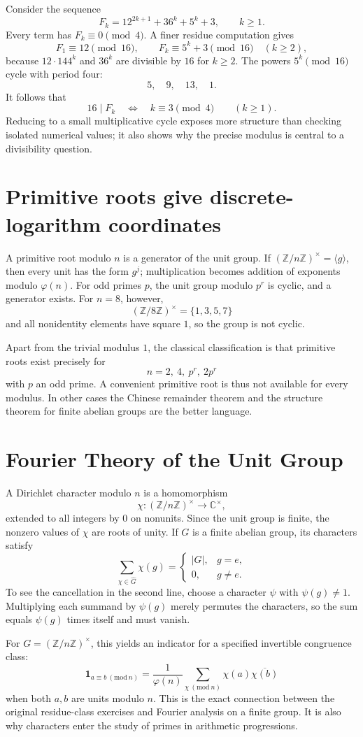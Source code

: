 Consider the sequence
\[
 F_k=12^{2k+1}+36^k+5^k+3,\qquad k\ge1.
\]
Every term has \(F_k\equiv0\pmod4\). A finer residue computation gives
\[
 F_1\equiv12\pmod{16},\qquad
 F_k\equiv5^k+3\pmod{16}\quad(k\ge2),
\]
because \(12\cdot144^k\) and \(36^k\) are divisible by \(16\) for \(k\ge2\). The powers \(5^k\pmod{16}\) cycle with period four:
\[
 5,\quad9,\quad13,\quad1.
\]
It follows that
\[
 \boxed{16\mid F_k\quad\Longleftrightarrow\quad k\equiv3\pmod4}
 \qquad(k\ge1).
\]
Reducing to a small multiplicative cycle exposes more structure than checking isolated numerical values; it also shows why the precise modulus is central to a divisibility question.

\section{Primitive roots give discrete-logarithm coordinates}

A primitive root modulo \(n\) is a generator of the unit group. If
\((\mathbb Z/n\mathbb Z)^\times=\langle g\rangle\), then every unit has the form \(g^j\); multiplication becomes addition of exponents modulo \(\varphi(n)\). For odd primes \(p\), the unit group modulo \(p^r\) is cyclic, and a generator exists. For \(n=8\), however,
\[
 (\mathbb Z/8\mathbb Z)^\times=\{1,3,5,7\}
\]
and all nonidentity elements have square \(1\), so the group is not cyclic.

Apart from the trivial modulus \(1\), the classical classification is that primitive roots exist precisely for
\[
 n=2,\ 4,\ p^r,\ 2p^r
\]
with \(p\) an odd prime. A convenient primitive root is thus not available for every modulus. In other cases the Chinese remainder theorem and the structure theorem for finite abelian groups are the better language.

\section{Fourier Theory of the Unit Group}

A Dirichlet character modulo \(n\) is a homomorphism
\[
 \chi:(\mathbb Z/n\mathbb Z)^\times\longrightarrow\mathbb C^\times,
\]
extended to all integers by \(0\) on nonunits. Since the unit group is finite, the nonzero values of \(\chi\) are roots of unity. If \(G\) is a finite abelian group, its characters satisfy
\[
 \sum_{\chi\in\widehat G}\chi(g)
 =\begin{cases}|G|,&g=e,\\0,&g\ne e.\end{cases}
\]
To see the cancellation in the second line, choose a character \(\psi\) with \(\psi(g)\ne1\). Multiplying each summand by \(\psi(g)\) merely permutes the characters, so the sum equals \(\psi(g)\) times itself and must vanish.

For \(G=(\mathbb Z/n\mathbb Z)^\times\), this yields an indicator for a specified invertible congruence class:
\[
 \mathbf 1_{a\equiv b\ (\mathrm{mod}\ n)}
 =\frac1{\varphi(n)}
   \sum_{\chi\ (\mathrm{mod}\ n)}\chi(a)\overline{\chi(b)}
\]
when both \(a,b\) are units modulo \(n\). This is the exact connection between the original residue-class exercises and Fourier analysis on a finite group. It is also why characters enter the study of primes in arithmetic progressions.
